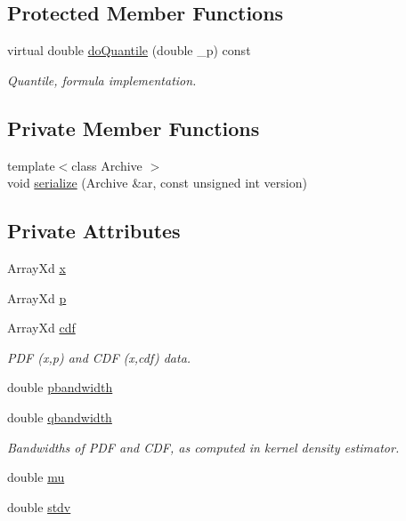 \subsection*{Protected Member Functions}
\begin{DoxyCompactItemize}
\item 
virtual double \hyperlink{class_c_empirical_c_r_v_a86a5cc58d5aecb3c12f20d48c2d6c027}{do\-Quantile} (double \-\_\-p) const 
\begin{DoxyCompactList}\small\item\em Quantile, formula implementation. \end{DoxyCompactList}\end{DoxyCompactItemize}
\subsection*{Private Member Functions}
\begin{DoxyCompactItemize}
\item 
{\footnotesize template$<$class Archive $>$ }\\void \hyperlink{class_c_empirical_c_r_v_abb3f92128e9c135d612f2694d202b754}{serialize} (Archive \&ar, const unsigned int version)
\end{DoxyCompactItemize}
\subsection*{Private Attributes}
\begin{DoxyCompactItemize}
\item 
Array\-Xd \hyperlink{class_c_empirical_c_r_v_a9fa34c36e5695450ab958078517882ed}{x}
\item 
Array\-Xd \hyperlink{class_c_empirical_c_r_v_ab0e5305502410acb609ba60afa5e7de5}{p}
\item 
Array\-Xd \hyperlink{class_c_empirical_c_r_v_aab4138bc58b4031bf40d223b5444bc4d}{cdf}
\begin{DoxyCompactList}\small\item\em P\-D\-F (x,p) and C\-D\-F (x,cdf) data. \end{DoxyCompactList}\item 
double \hyperlink{class_c_empirical_c_r_v_aca50bd8bce019a6c82c2d1f65a1ec948}{pbandwidth}
\item 
double \hyperlink{class_c_empirical_c_r_v_a364ed1fc45edfa3a8569baa21de707d7}{qbandwidth}
\begin{DoxyCompactList}\small\item\em Bandwidths of P\-D\-F and C\-D\-F, as computed in kernel density estimator. \end{DoxyCompactList}\item 
double \hyperlink{class_c_empirical_c_r_v_a6fa15be69d72045664907de9f6c202ac}{mu}
\item 
double \hyperlink{class_c_empirical_c_r_v_aefa632e54ddee3239c56c55a0cbf748e}{stdv}
\end{DoxyCompactItemize}
